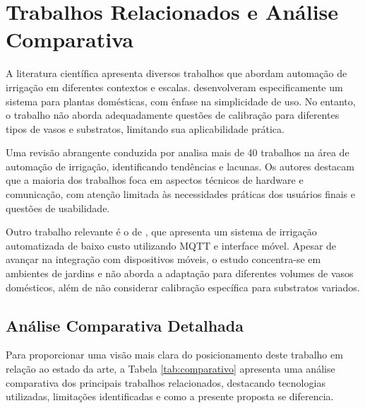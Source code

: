 \documentclass[twoside,english,brazilian]{UNISINOSmonografia}
\begin{document}
\section{Trabalhos Relacionados e Análise Comparativa}

A literatura científica apresenta diversos trabalhos que abordam automação de irrigação em diferentes contextos e escalas.  desenvolveram especificamente um sistema para plantas domésticas, com ênfase na simplicidade de uso. No entanto, o trabalho não aborda adequadamente questões de calibração para diferentes tipos de vasos e substratos, limitando sua aplicabilidade prática.

Uma revisão abrangente conduzida por  analisa mais de 40 trabalhos na área de automação de irrigação, identificando tendências e lacunas. Os autores destacam que a maioria dos trabalhos foca em aspectos técnicos de hardware e comunicação, com atenção limitada às necessidades práticas dos usuários finais e questões de usabilidade.

Outro trabalho relevante é o de , que apresenta um sistema de irrigação automatizada de baixo custo utilizando MQTT e interface móvel. Apesar de avançar na integração com dispositivos móveis, o estudo concentra-se em ambientes de jardins e não aborda a adaptação para diferentes volumes de vasos domésticos, além de não considerar calibração específica para substratos variados.

\subsection{Análise Comparativa Detalhada}

Para proporcionar uma visão mais clara do posicionamento deste trabalho em relação ao estado da arte, a Tabela \ref{tab:comparativo} apresenta uma análise comparativa dos principais trabalhos relacionados, destacando tecnologias utilizadas, limitações identificadas e como a presente proposta se diferencia.
\end{document}
